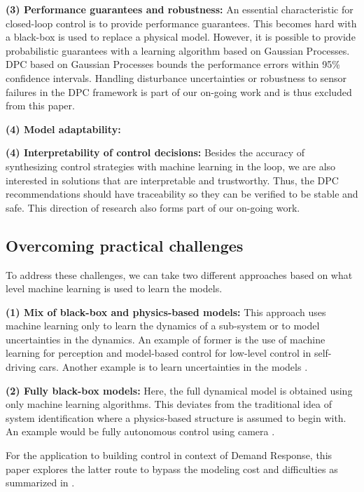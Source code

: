 \noindent \textbf{(3) Performance guarantees and robustness:} An essential characteristic for closed-loop control is to provide performance guarantees. This becomes hard with a black-box is used to replace a physical model. However, it is possible to provide probabilistic guarantees with a learning algorithm based on Gaussian Processes. DPC based on Gaussian Processes bounds the performance errors within 95\% confidence intervals. Handling disturbance uncertainties or robustness to sensor failures in the DPC framework is part of our on-going work and is thus excluded from this paper.

\noindent \textbf{(4) Model adaptability:} 

\noindent \textbf{(4) Interpretability of control decisions:} Besides the accuracy of synthesizing control strategies with machine learning in the loop, we are also interested in solutions that are interpretable and trustworthy. Thus, the DPC recommendations should have traceability so they can be verified to be stable and safe. This direction of research also forms part of our on-going work.

\subsection{Overcoming practical challenges}
To address these challenges, we can take two different approaches based on what level machine learning is used to learn the models.

\noindent \textbf{(1) Mix of black-box and physics-based models:} This approach uses machine learning only to learn the dynamics of a sub-system or to model uncertainties in the dynamics. An example of former is the use of machine learning for perception and model-based control for low-level control in self-driving cars. Another example is to learn uncertainties in the models \cite{Berkenkamp2015,Desaraju2016}.

\noindent \textbf{(2) Fully black-box models:} Here, the full dynamical model is obtained using only machine learning algorithms. This deviates from the traditional idea of system identification where a physics-based structure is assumed to begin with. An example would be fully autonomous control using camera \cite{Bojarski2016}. 

For the application to building control in context of Demand Response, this paper explores the latter route to bypass the modeling cost and difficulties as summarized in \cite{Sturzenegger2016}.

